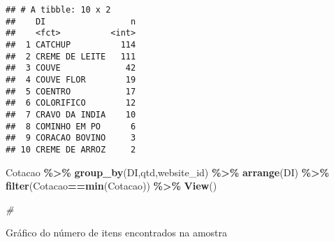 \documentclass[
]{article}
\newenvironment{Shaded}{\begin{snugshade}}{\end{snugshade}}
\newcommand{\CommentTok}[1]{\textcolor[rgb]{0.56,0.35,0.01}{\textit{#1}}}
\newcommand{\KeywordTok}[1]{\textcolor[rgb]{0.13,0.29,0.53}{\textbf{#1}}}
\newcommand{\NormalTok}[1]{#1}
\newcommand{\OperatorTok}[1]{\textcolor[rgb]{0.81,0.36,0.00}{\textbf{#1}}}
\newcommand{\StringTok}[1]{\textcolor[rgb]{0.31,0.60,0.02}{#1}}
\begin{document}
\begin{verbatim}
## # A tibble: 10 x 2
##    DI                 n
##    <fct>          <int>
##  1 CATCHUP          114
##  2 CREME DE LEITE   111
##  3 COUVE             42
##  4 COUVE FLOR        19
##  5 COENTRO           17
##  6 COLORIFICO        12
##  7 CRAVO DA INDIA    10
##  8 COMINHO EM PO      6
##  9 CORACAO BOVINO     3
## 10 CREME DE ARROZ     2
\end{verbatim}

\begin{Shaded}
\begin{Highlighting}[]
\NormalTok{  Cotacao }\OperatorTok{\%\textgreater{}\%}\StringTok{ }\KeywordTok{group\_by}\NormalTok{(DI,qtd,website\_id) }\OperatorTok{\%\textgreater{}\%}\StringTok{ }\KeywordTok{arrange}\NormalTok{(DI) }\OperatorTok{\%\textgreater{}\%}\StringTok{ }\KeywordTok{filter}\NormalTok{(Cotacao}\OperatorTok{==}\KeywordTok{min}\NormalTok{(Cotacao)) }\OperatorTok{\%\textgreater{}\%}\StringTok{ }\KeywordTok{View}\NormalTok{()}
 
  \CommentTok{\# }
\end{Highlighting}
\end{Shaded}

Gráfico do número de itens encontrados na amostra
\end{document}

